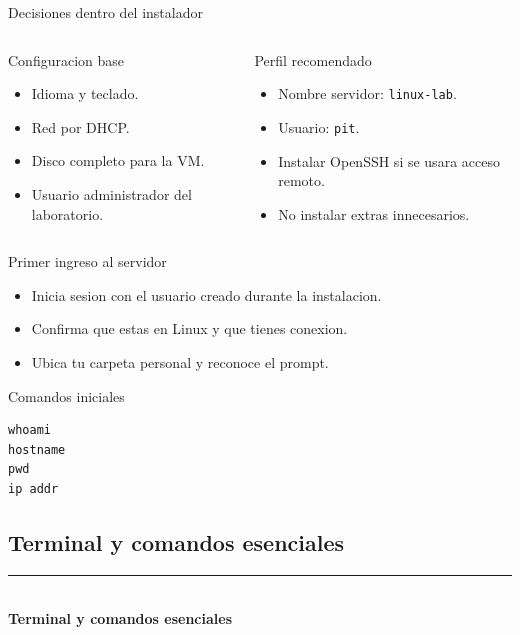 \documentclass[aspectratio=169]{beamer}
\newcommand{\MainHeaderSlide}[2]{%
  \begin{frame}[plain]
    \hypertarget{#2}{}
    \vspace*{0.25\textheight}
    {\color{black}\rule{0.28\textwidth}{1.2pt}}\\[0.5em]
    {\usebeamerfont{title}\fontsize{34}{40}\selectfont\bfseries #1}
  \end{frame}
}
\begin{document}
\begin{frame}{Decisiones dentro del instalador}
  \begin{columns}[t]
    \begin{block}{Configuracion base}
      \begin{itemize}
        \item Idioma y teclado.
        \item Red por DHCP.
        \item Disco completo para la VM.
        \item Usuario administrador del laboratorio.
      \end{itemize}
    \end{block}
    \begin{exampleblock}{Perfil recomendado}
      \begin{itemize}
        \item Nombre servidor: \texttt{linux-lab}.
        \item Usuario: \texttt{pit}.
        \item Instalar OpenSSH si se usara acceso remoto.
        \item No instalar extras innecesarios.
      \end{itemize}
    \end{exampleblock}
  \end{columns}
\end{frame}

\begin{frame}[fragile]{Primer ingreso al servidor}
  \begin{itemize}
    \item Inicia sesion con el usuario creado durante la instalacion.
    \item Confirma que estas en Linux y que tienes conexion.
    \item Ubica tu carpeta personal y reconoce el prompt.
  \end{itemize}
  \vspace{0.25cm}
  \begin{exampleblock}{Comandos iniciales}
\begin{verbatim}
whoami
hostname
pwd
ip addr
\end{verbatim}
  \end{exampleblock}
\end{frame}

\subsection{Terminal y comandos esenciales}
\MainHeaderSlide{Terminal y comandos esenciales}{idx-terminal-comandos}
\end{document}
